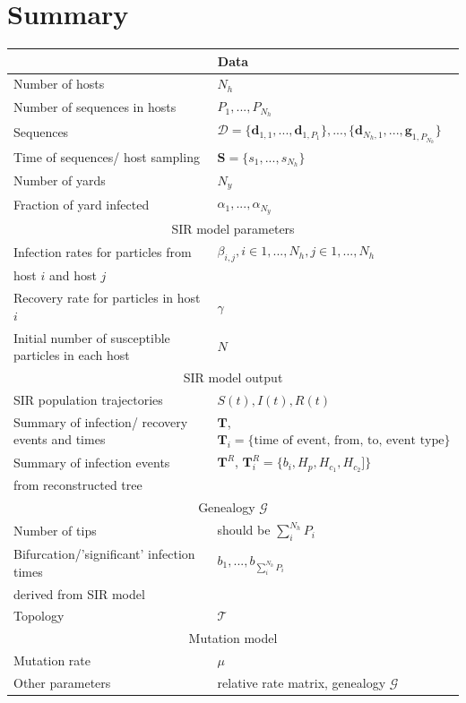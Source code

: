 \documentclass[]{report}
\begin{document}
\section{Summary}
\begin{tabular}{|l|l|}
\hline 
\multicolumn{2}{|c|}{Data}\\
\hline
Number of hosts & $N_h$  \\
Number of sequences in hosts & $P_1,...,P_{N_h}$ \\
Sequences & $\mathcal{D}=\{\mathbf{d}_{1,1},...,\mathbf{d}_{1,P_1}\},...,\{\mathbf{d}_{N_h,1},...,\mathbf{g}_{1,P_{N_h}}\} $ \\
Time of sequences/ host sampling& $\mathbf{S}=\{s_1,...,s_{N_h}\}$ \\
Number of yards & $N_y$  \\
Fraction of yard infected & $\alpha_1,...,\alpha_{N_y}$ \\
\hline 
\multicolumn{2}{|c|}{SIR model parameters}\\
\hline
Infection rates for particles from  & $\beta_{i,j}, i \in 1,...,N_h, j \in 1,...,N_h$ \\
host $i$ and host $j$ & \\
Recovery rate for particles in host $i$ & $\gamma$ \\
Initial number of susceptible particles in each host & $N$ \\
\hline 
\multicolumn{2}{|c|}{SIR model output}\\
\hline
SIR population trajectories & $S(t), I(t), R(t)$ \\
Summary of infection/ recovery events and times & $\mathbf{T}$, $\mathbf{T}_i=\{\textrm{time of event, from, to, event type} \}$ \\
Summary of infection events & $\mathbf{T}^R$, $\mathbf{T}^R_i=\{b_i, H_p,H_{c_1}, H_{c_2}] \}$ \\
from reconstructed tree & \\
\hline 
\multicolumn{2}{|c|}{Genealogy $\mathcal{G}$}\\
\hline
Number of tips & should be $\sum_i^{N_h}P_i$ \\
Bifurcation/'significant' infection times & $b_1,...,b_{\sum_i^{N_h}P_i}$ \\
derived from SIR model&  \\
Topology & $\mathcal{T} $\\
\hline
\multicolumn{2}{|c|}{Mutation model}\\
\hline
Mutation rate & $\mu$ \\
Other parameters & relative rate matrix, genealogy $\mathcal{G}$ \\
\hline
\end{tabular}


\end{document}
